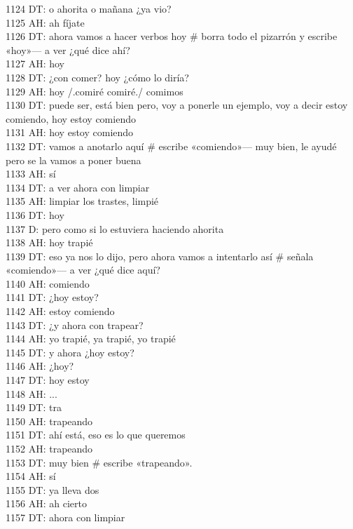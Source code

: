 1124 DT: o ahorita o mañana ¿ya vio?\\
1125 AH: ah fíjate\\
1126 DT: ahora vamos a hacer verbos hoy \# borra todo el pizarrón y escribe «hoy»--- a ver ¿qué dice ahí?\\
1127 AH: hoy\\
1128 DT: ¿con comer? hoy ¿cómo lo diría?\\
1129 AH: hoy /.comiré comiré./ comimos\\
1130 DT: puede ser, está bien pero, voy a ponerle un ejemplo, voy a decir estoy comiendo, hoy estoy comiendo\\
1131 AH: hoy estoy comiendo\\
1132 DT: vamos a anotarlo aquí \# escribe «comiendo»--- muy bien, le ayudé pero se la vamos a poner buena\\
1133 AH: sí\\
1134 DT: a ver ahora con limpiar\\
1135 AH: limpiar los trastes, limpié\\
1136 DT: hoy\\
1137 D: pero como si lo estuviera haciendo ahorita\\
1138 AH: hoy trapié\\
1139 DT: eso ya nos lo dijo, pero ahora vamos a intentarlo así \# señala «comiendo»--- a ver ¿qué dice aquí?\\
1140 AH: comiendo\\
1141 DT: ¿hoy estoy?\\
1142 AH: estoy comiendo\\
1143 DT: ¿y ahora con trapear?\\
1144 AH: yo trapié, ya trapié, yo trapié\\
1145 DT: y ahora ¿hoy estoy?\\
1146 AH: ¿hoy?\\
1147 DT: hoy estoy\\
1148 AH: ...\\
1149 DT: tra\\
1150 AH: trapeando\\
1151 DT: ahí está, eso es lo que queremos\\
1152 AH: trapeando\\
1153 DT: muy bien \# escribe «trapeando».\\
1154 AH: sí\\
1155 DT: ya lleva dos\\
1156 AH: ah cierto\\
1157 DT: ahora con limpiar\\
